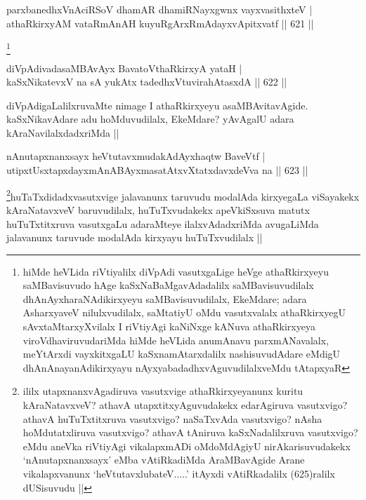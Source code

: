 	
\begin{shl}
parxbanedhxVnAciRSoV dhamAR dhamiRNayxgwnx vayxvasithxteV | \\
athaRkirxyAM vataRmAnAH kuyuRgArxRmAdayxvApitxvatf \hfill||  621 ||  
\end{shl}

\begin{artha}
\footnote{hiMde heVLida riVtiyalilx diVpAdi vasutxgaLige heVge athaRkirxyeyu saMBavisuvudo hAge kaSxNaBaMgavAdadalilx saMBavisuvudilalx dhAnAyxharaNAdikirxyeyu saMBavisuvudilalx, EkeMdare; adara AsharxyaveV nilulxvudilalx, saMtatiyU oMdu vasutxvalalx athaRkirxyegU sAvxtaMtarxyXvilalx I riVtiyAgi kaNiNxge kANuva athaRkirxyeya viroVdhaviruvudariMda hiMde heVLida anumAnavu parxmANavalalx, meYtArxdi vayxkitxgaLU kaSxnamAtarxdalilx nashisuvudAdare eMdigU dhAnAnayanAdikirxyayu nAyxyabadadhxvAguvudilalxveMdu tAtapxyaR}
\end{artha}

\begin{shl}
diVpAdivadasaMBAvAyx BavatoV\s thaRkirxyA yataH | \\
kaSxNikatevxV na sA yukAtx tadedhxVtuvirahAtasxdA \hfill||  622 ||  
\end{shl}

\begin{artha}
diVpAdigaLalilxruvaMte nimage I athaRkirxyeyu asaMBAvitavAgide. kaSxNikavAdare adu hoMduvudilalx, EkeMdare? yAvAgalU adara kAraNavilalxdadxriMda ||
\end{artha}


\begin{shl}
nAnutapxnanxsayx heVtutavxmudakAdAyxhaqtw BaveVtf | \\
utipxtUsxtapxdayxmAnABAyxmasatAtxvXtatxdavxdeVva na \hfill||  623 ||  
\end{shl}

\begin{artha}
\footnote{ililx utapxnanxvAgadiruva vasutxvige athaRkirxyeyanunx kuritu kAraNatavxveV? athavA utapxtitxyAguvudakekx edarAgiruva vasutxvigo? athavA huTuTxtitxruva vasutxvigo? naSaTxvAda vasutxvigo? nAsha hoMdutatxliruva vasutxvigo? athavA tAniruva kaSxNadalilxruva vasutxvigo? eMdu aneVka riVtiyAgi vikalapxmADi oMdoMdAgiyU nirAkarisuvudakekx `nAnutapxnanxsayx' eMba vAtiRkadiMda AraMBavAgide Arane vikalapxvanunx `heVtutavxlubateV.....' itAyxdi vAtiRkadalilx (625)ralilx dUSisuvudu ||}huTaTxdidadxvasutxvige jalavanunx taruvudu modalAda kirxyegaLa viSayakekx kAraNatavxveV baruvudilalx, huTuTxvudakekx apeVkiSxsuva matutx huTuTxtitxruva vasutxgaLu adaraMteye ilalxvAdadxriMda avugaLiMda jalavanunx taruvude modalAda kirxyayu huTuTxvudilalx ||
\end{artha}

